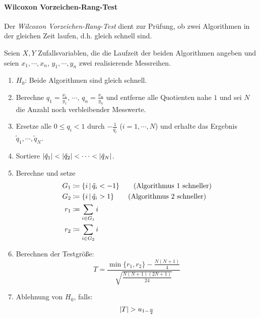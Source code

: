 		\paragraph{Wilcoxon Vorzeichen-Rang-Test}
			Der \textit{Wilcoxon Vorzeichen-Rang-Test} dient zur Prüfung, ob zwei Algorithmen in der gleichen Zeit laufen, d.h. gleich schnell sind.

			Seien \( X, Y \) Zufallsvariablen, die die Laufzeit der beiden Algorithmen angeben und seien \( x_1, \cdots, x_n \), \( y_1, \cdots, y_n \) zwei realisierende Messreihen.
			\begin{enumerate}
				\item \(H_0\): \quad Beide Algorithmen sind gleich schnell.
				\item Berechne \( q_1 = \frac{x_1}{y_1},\, \cdots,\, q_n = \frac{x_n}{y_n} \) und entferne alle Quotienten nahe \(1\) und sei \( N \) die Anzahl noch verbleibender Messwerte.
				\item Ersetze alle \( 0 \leq q_i < 1 \) durch \( -\frac{1}{q_i} \) (\( i = 1, \cdots, N \)) und erhalte das Ergebnis \( \tilde{q}_1, \cdots, \tilde{q}_N \).
				\item Sortiere \( \abs{\tilde{q}_1} < \abs{\tilde{q}_2} < \cdots < \abs{\tilde{q}_N} \).
				\item Berechne und setze
					\begin{align*}
						G_1 & \coloneqq \{ i \,\vert\, \tilde{q}_i < -1 \} \tag{Algorithmus 1 schneller} \\
						G_2 & \coloneqq \{ i \,\vert\, \tilde{q}_i > 1 \} \tag{Algorithmus 2 schneller}  \\
						r_1 & \coloneqq \sum_{i \in G_1} i                                               \\
						r_2 & \coloneqq \sum_{i \in G_2} i
					\end{align*}
				\item Berechnen der Testgröße:
					\begin{equation*}
						T = \frac{\min \{ r_1, r_2 \} - \frac{N(N + 1)}{4}}{\sqrt{\frac{N(N + 1)(2N + 1)}{24}}}
					\end{equation*}
				\item Ablehnung von \(H_0\), falls:
					\begin{equation*}
						\abs{T} > u_{1 - \frac{\alpha}{2}}
					\end{equation*}
			\end{enumerate}

